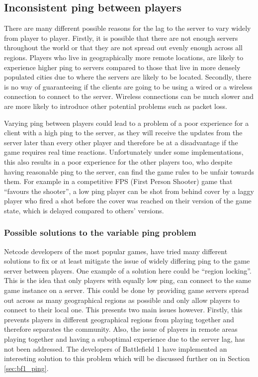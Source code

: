 \subsection{Inconsistent ping between players}
There are many different possible reasons for the lag to the server to vary widely from player to player. Firstly, it is possible that there are not enough servers throughout the world or that they are not spread out evenly enough across all regions. Players who live in geographically more remote locations, are likely to experience higher ping to servers compared to those that live in more densely populated cities due to where the servers are likely to be located. Secondly, there is no way of guaranteeing if the clients are going to be using a wired or a wireless connection to connect to the server. Wireless connections can be much slower and are more likely to introduce other potential problems such as packet loss.

Varying ping between players could lead to a problem of a poor experience for a client with a high ping to the server, as they will receive the updates from the server later than every other player and therefore be at a disadvantage if the game requires real time reactions. Unfortunately under some implementations, this also results in a poor experience for the other players too, who despite having reasonable ping to the server, can find the game rules to be unfair towards them. For example in a competitive FPS (First Person Shooter) game that ``favours the shooter'', a low ping player can be shot from behind cover by a laggy player who fired a shot before the cover was reached on their version of the game state, which is delayed compared to others' versions.


\subsubsection{Possible solutions to the variable ping problem}
Netcode developers of the most popular games, have tried many different solutions to fix or at least mitigate the issue of widely differing ping to the game server between players. One example of a solution here could be ``region locking''. This is the idea that only players with equally low ping, can connect to the same game instance on a server. This could be done by providing game servers spread out across as many geographical regions as possible and only allow players to connect to their local one. This presents two main issues however. Firstly, this prevents players in different geographical regions from playing together and therefore separates the community. Also, the issue of players in remote areas playing together and having a suboptimal experience due to the server lag, has not been addressed. The developers of Battlefield 1 have implemented an interesting solution to this problem which will be discussed further on in Section \ref{sec:bf1_ping}.


